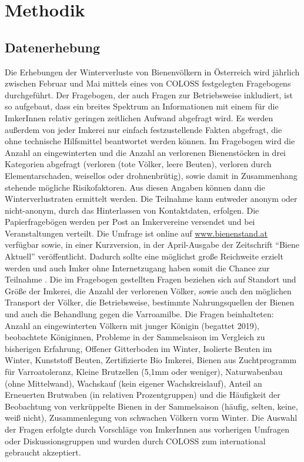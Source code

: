 \section{Methodik}

\subsection{Datenerhebung}

Die Erhebungen der Winterverluste von Bienenvölkern in Österreich wird jährlich zwischen Februar und Mai mittels eines von COLOSS festgelegten Fragebogens durchgeführt. Der Fragebogen, der auch Fragen zur Betriebsweise inkludiert, ist so aufgebaut, dass ein breites Spektrum an Informationen mit einem für die ImkerInnen relativ geringen zeitlichen Aufwand abgefragt wird. Es werden außerdem von jeder Imkerei nur einfach festzustellende Fakten abgefragt, die ohne technische Hilfsmittel beantwortet werden können. Im Fragebogen wird die Anzahl an eingewinterten und die Anzahl an verlorenen Bienenstöcken in drei Kategorien abgefragt (verloren (tote Völker, leere Beuten), verloren durch Elementarschaden, weisellos oder drohnenbrütig), sowie damit in Zusammenhang stehende mögliche Risikofaktoren. Aus diesen Angaben können dann die  Winterverlustraten ermittelt werden.
\newline
Die Teilnahme kann entweder anonym oder nicht-anonym, durch das Hinterlassen von Kontaktdaten, erfolgen. Die Papierfragebögen werden per Post an Imkervereine versendet und bei Veranstaltungen verteilt. Die Umfrage ist online auf \url{www.bienenstand.at} verfügbar sowie, in einer Kurzversion, in der April-Ausgabe der Zeitschrift \enquote{Biene Aktuell} veröffentlicht. Dadurch sollte eine möglichst große Reichweite erzielt werden und auch Imker ohne Internetzugang haben somit die Chance zur Teilnahme \citep{vanderzee2013}.
\newline
Die im Fragebogen gestellten Fragen beziehen sich auf Standort und Größe der Imkerei, die Anzahl der verlorenen Völker, sowie auch den möglichen Transport der Völker, die Betriebsweise, bestimmte Nahrungsquellen der Bienen und auch die Behandlung gegen die Varroamilbe. Die Fragen beinhalteten: Anzahl an eingewinterten Völkern mit junger Königin (begattet 2019), beobachtete Königinnen, Probleme in der Sammelsaison im Vergleich zu bisherigen Erfahrung, Offener Gitterboden im Winter, Isolierte Beuten im Winter, Kunststoff Beuten, Zertifizierte Bio Imkerei, Bienen aus Zuchtprogramm für Varroatoleranz, Kleine Brutzellen (5,1mm oder weniger), Naturwabenbau (ohne Mittelwand), Wachskauf (kein eigener Wachskreislauf), Anteil an Erneuerten Brutwaben (in relativen Prozentgruppen) und die Häufigkeit der Beobachtung von verkrüppelte Bienen in der Sammelsaison (häufig, selten, keine, weiß nicht), Zusammenlegung von schwachen Völkern vorm Winter. Die Auswahl der Fragen erfolgte durch Vorschläge von ImkerInnen aus vorherigen Umfragen oder Diskussionsgruppen und wurden durch COLOSS zum international gebraucht akzeptiert.
